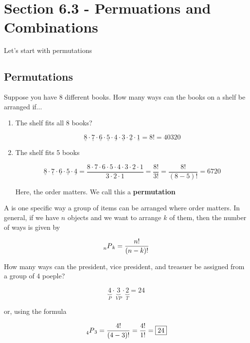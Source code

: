 \documentclass[../../Main.tex]{subfiles}
\begin{document}
\section{Section 6.3 - Permuations and Combinations}

Let's start with permutations

\subsection{Permutations}

Suppose you have 8 different books. How many ways can the books on a shelf be arranged if... 

\begin{enumerate}
    \item 
    {
        The shelf fits all 8 books?

        $$\underline{8} \cdot \underline{7} \cdot \underline{6} \cdot \underline{5} \cdot \underline{4} \cdot \underline{3} \cdot \underline{2} \cdot \underline{1} = 8! = \boxed{40320}$$
    }

    \item
    {
        The shelf fits 5 books

        $$\underline{8} \cdot \underline{7} \cdot \underline{6} \cdot \underline{5} \cdot \underline{4} = \frac{8 \cdot 7 \cdot 6 \cdot 5 \cdot 4 \cdot 3 \cdot 2 \cdot 1}{3 \cdot 2 \cdot 1} = \frac{8!}{3!} = \frac{8!}{(8 - 5)!} = \boxed{6720}$$

        Here, the  order matters. We call this a \textbf{permutation}
    }
\end{enumerate}

\begin{definition}[Permutation]
    A  is one specific way a group of items can be arranged where order matters. 
    In general, if we have $n$ objects and we want to arrange $k$ of them, then the number of ways is given by

    $$\prescript{}{n}{P}_k = \frac{n!}{(n - k)!}$$
\end{definition}

\begin{example}
    How many ways can the president, vice president, and treasuer be assigned from a group of 4 poeple?

    $$\underbrace{4}_{P} \cdot \underbrace{3}_{VP} \cdot \underbrace{2}_{T} = \boxed{24}$$

    or, using the formula

    $$\prescript{}{4}{P}_3 = \frac{4!}{(4 - 3)!} = \frac{4!}{1!} = \boxed{24}$$
\end{example}
\end{document}
